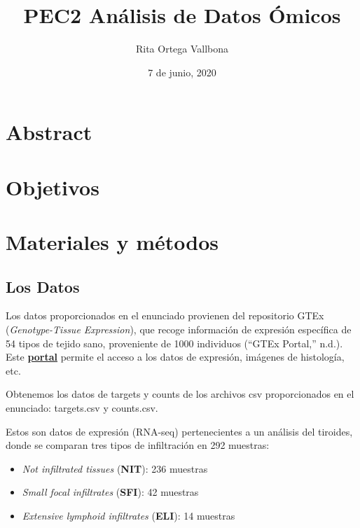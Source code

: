 \documentclass[
  english,
]{article}
\title{PEC2 Análisis de Datos Ómicos}
\author{Rita Ortega Vallbona}
\date{7 de junio, 2020}
\providecommand{\tightlist}{%
  \setlength{\itemsep}{0pt}\setlength{\parskip}{0pt}}
\begin{document}
\maketitle

{
\setcounter{tocdepth}{3}
\tableofcontents
}
\hypertarget{abstract}{%
\section{Abstract}\label{abstract}}

\hypertarget{objetivos}{%
\section{Objetivos}\label{objetivos}}

\hypertarget{materiales-y-muxe9todos}{%
\section{Materiales y métodos}\label{materiales-y-muxe9todos}}

\hypertarget{los-datos}{%
\subsection{Los Datos}\label{los-datos}}

Los datos proporcionados en el enunciado provienen del repositorio GTEx
(\emph{Genotype-Tissue Expression}), que recoge información de expresión
específica de 54 tipos de tejido sano, proveniente de 1000 individuos
(``GTEx Portal,'' n.d.). Este
\href{https://www.gtexportal.org/home/}{\textbf{portal}} permite el
acceso a los datos de expresión, imágenes de histología, etc.

Obtenemos los datos de targets y counts de los archivos csv
proporcionados en el enunciado: targets.csv y counts.csv.

Estos son datos de expresión (RNA-seq) pertenecientes a un análisis del
tiroides, donde se comparan tres tipos de infiltración en 292 muestras:

\begin{itemize}
\tightlist
\item
  \emph{Not infiltrated tissues} (\textbf{NIT}): 236 muestras
\item
  \emph{Small focal infiltrates} (\textbf{SFI}): 42 muestras
\item
  \emph{Extensive lymphoid infiltrates} (\textbf{ELI}): 14 muestras
\end{itemize}
\end{document}
